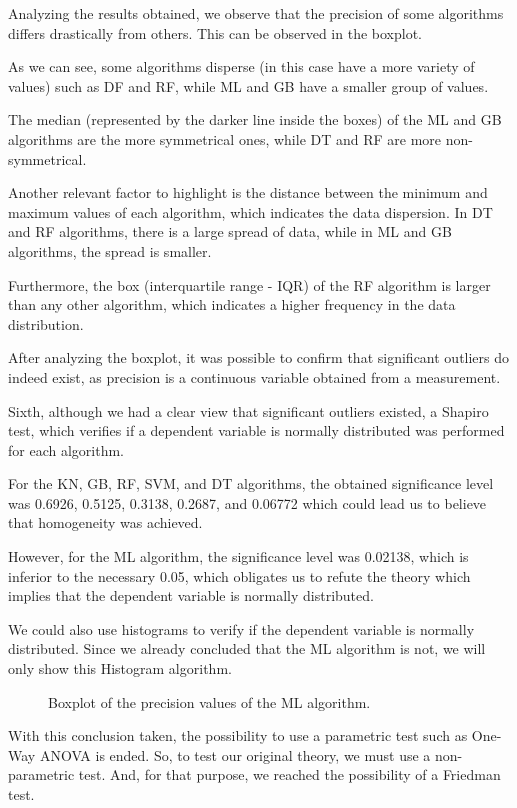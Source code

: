 \documentclass[conference]{IEEEtran}
\begin{document}
Analyzing the results obtained, we observe that the precision of some algorithms differs drastically from others. This can be observed in the boxplot.

As we can see, some algorithms disperse (in this case have a more variety of values) such as DF and RF, while ML and GB have a smaller group of values.

The median (represented by the darker line inside the boxes) of the  ML and GB algorithms are the more symmetrical ones, while DT and RF are more non-symmetrical.

Another relevant factor to highlight is the distance between the minimum and maximum values of each algorithm, which indicates the data dispersion. In DT and RF algorithms, there is a large spread of data, while in ML and GB algorithms, the spread is smaller.

Furthermore, the box (interquartile range - IQR) of the RF algorithm is larger than any other algorithm, which indicates a higher frequency in the data distribution.

After analyzing the boxplot, it was possible to confirm that significant outliers do indeed exist, as precision is a continuous variable obtained from a measurement. 

Sixth, although we had a clear view that significant outliers existed, a Shapiro test, which verifies if a dependent variable is normally distributed was performed for each algorithm.

For the KN, GB, RF, SVM, and DT algorithms, the obtained significance level was 0.6926, 0.5125, 0.3138, 0.2687, and 0.06772 which could lead us to believe that homogeneity was achieved.

However, for the ML algorithm, the significance level was 0.02138, which is inferior to the necessary 0.05, which obligates us to refute the theory which implies that the dependent variable is normally distributed.

We could also use histograms to verify if the dependent variable is normally distributed. Since we already concluded that the ML algorithm is not, we will only show this Histogram algorithm.

\begin{figure}[H]
    \caption{Boxplot of the precision values of the ML algorithm.}
    \label{vehicle_boxplot}
\end{figure}

With this conclusion taken, the possibility to use a parametric test such as One-Way ANOVA is ended. So, to test our original theory, we must use a non-parametric test. And, for that purpose, we reached the possibility of a Friedman test.
\end{document}
